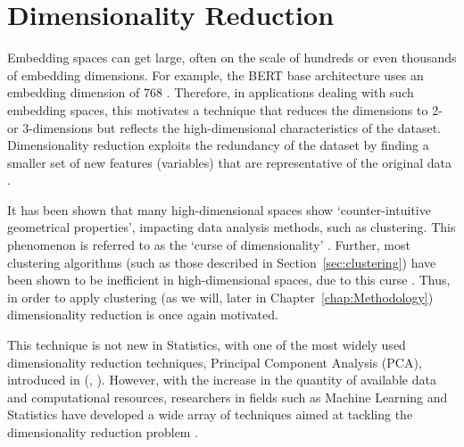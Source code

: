 \documentclass[10pt,oneside]{report}
\renewcommand{\citet}[1]{\citeauthor{#1}, \citeyear{#1}}
\begin{document}

\section{Dimensionality Reduction}\label{sec:dimred}

Embedding spaces can get large, often on the scale of hundreds or even thousands of embedding dimensions. For example, the BERT base architecture uses an embedding dimension of 768 \cite{devlin2019bert}. Therefore, in applications dealing with such embedding spaces, this motivates a technique that reduces the dimensions to 2- or 3-dimensions but reflects the high-dimensional characteristics of the dataset. 
Dimensionality reduction exploits the redundancy of the dataset by finding a smaller set of new features (variables) that are representative of the original data \cite{sorzano2014survey}.

It has been shown that many high-dimensional spaces show `counter-intuitive geometrical properties', impacting data analysis methods, such as clustering. This phenomenon is referred to as the `curse of dimensionality' \cite{verleysen2005curse, hinneburg1999optimal}. Further, most clustering algorithms (such as those described in Section~\ref{sec:clustering}) have been shown to be inefficient in high-dimensional spaces, due to this curse \cite{hinneburg1999optimal}. Thus, in order to apply clustering (as we will, later in Chapter~\ref{chap:Methodology}) dimensionality reduction is once again motivated.

This technique is not new in Statistics, with one of the most widely used dimensionality reduction techniques, Principal Component Analysis (PCA), introduced in (\citet{pearson1901liii}). However, with the increase in the quantity of available data and computational resources, researchers in fields such as Machine Learning and Statistics have developed a wide array of techniques aimed at tackling the dimensionality reduction problem \cite{sorzano2014survey}.
\end{document}
